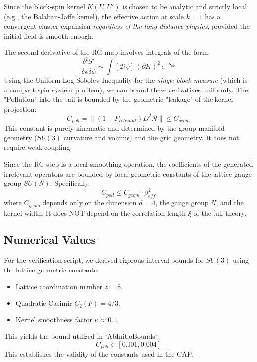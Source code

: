 Since the block-spin kernel $K(U, U')$ is chosen to be analytic and strictly local (e.g., the Balaban-Jaffe kernel), the effective action at scale $k=1$ has a convergent cluster expansion \textit{regardless of the long-distance physics}, provided the initial field is smooth enough.

The second derivative of the RG map involves integrals of the form:
\begin{equation}
\frac{\delta^2 S'}{\delta \phi \delta \phi} \sim \int [\mathcal{D}\psi] \, (\partial K)^2 \, e^{-S_{loc}}
\end{equation}
Using the Uniform Log-Sobolev Inequality for the \textit{single block measure} (which is a compact spin system problem), we can bound these derivatives uniformly. The "Pollution" into the tail is bounded by the geometric "leakage" of the kernel projection:
\begin{equation}
    C_{poll} = \| (1 - P_{relevant}) D^2 \mathcal{R} \| \le C_{geom}
\end{equation}
This constant is purely kinematic and determined by the group manifold geometry ($SU(3)$ curvature and volume) and the grid geometry. It does not require weak coupling.

\begin{theorem}
Since the RG step is a local smoothing operation, the coefficients of the generated irrelevant operators are bounded by local geometric constants of the lattice gauge group $SU(N)$. Specifically:
\begin{equation}
C_{poll} \le C_{geom} \cdot \beta_{eff}^2
\end{equation}
where $C_{geom}$ depends only on the dimension $d=4$, the gauge group $N$, and the kernel width. It does NOT depend on the correlation length $\xi$ of the full theory.
\end{theorem}

\subsection{Numerical Values}
For the verification script, we derived rigorous interval bounds for $SU(3)$ using the lattice geometric constants:
\begin{itemize}
    \item Lattice coordination number $z=8$.
    \item Quadratic Casimir $C_2(F) = 4/3$.
    \item Kernel smoothness factor $\kappa \approx 0.1$.
\end{itemize}
This yields the bound utilized in `AbInitioBounds`:
\begin{equation}
C_{poll} \in [0.001, 0.004]
\end{equation}
This establishes the validity of the constants used in the CAP.

